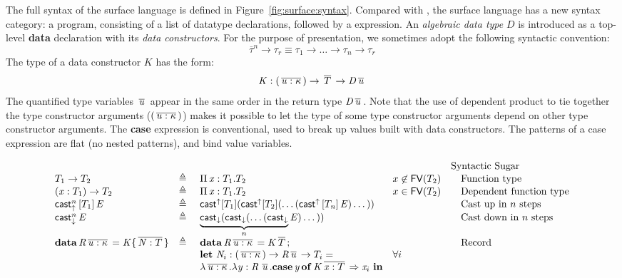 The full syntax of the surface language is defined in Figure~\ref{fig:surface:syntax}. Compared with \name, the surface language has a new syntax category: a program, consisting of a list of datatype declarations, followed by a expression. An \emph{algebraic data type} $D$ is introduced as a top-level \textbf{data} declaration with its \emph{data constructors}. For the purpose of presentation, we sometimes adopt the following syntactic convention:
\[
\overline{\tau}^n \rightarrow \tau_r \equiv \tau_1 \rightarrow \dots \rightarrow \tau_n \rightarrow \tau_r
\]
The type of a data constructor $K$ has the form:
\[
\mathit{K}  :  (  \,\overline{  \mathit{u}  :  \kappa  }\,  )  \rightarrow  \,\overline{  T  }\,  \rightarrow  \mathit{D}    \,\overline{  \mathit{u}  }\,
\]
The quantified type variables $\,\overline{  \mathit{u}  }\,$ appear in the same order in
the return type $\mathit{D}    \,\overline{  \mathit{u}  }\,$. Note that the use of dependent product
to tie together the type constructor arguments ($(  \,\overline{  \mathit{u}  :  \kappa  }\,  )$) makes
it possible to let the type of some type constructor arguments depend
on other type constructor arguments. The \textbf{case} expression is
conventional, used to break up values built with data constructors.
The patterns of a case expression are flat (no nested patterns), and
bind value variables.

\begin{figure*}
\centering
\gram{\ottpgm\ottinterrule
\ottdecl\ottinterrule
\ottu\ottinterrule
\ottp\ottinterrule
\ottE\ottinterrule
\ottV\ottinterrule
\ottGs}
\[\ottsurfsugar\] %
\caption{Syntax of the surface language}
\label{fig:surface:syntax}
\end{figure*}


